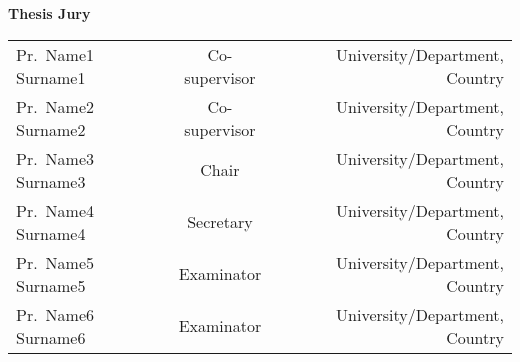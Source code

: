 \vspace{2cm}
\begin{flushleft}
    \begin{minipage}{0.6\linewidth}
        {\sffamily\bfseries Thesis Jury}\\
        \begin{tabular}{lcr}
            Pr.~Name1 {\sffamily Surname1} & Co-supervisor & University/Department, Country\\
            Pr.~Name2 {\sffamily Surname2} & Co-supervisor  & University/Department, Country\\
            Pr.~Name3 {\sffamily Surname3} & Chair & University/Department, Country\\
            Pr.~Name4 {\sffamily Surname4} & Secretary & University/Department, Country\\
            Pr.~Name5 {\sffamily Surname5} & Examinator & University/Department, Country\\
            Pr.~Name6 {\sffamily Surname6} & Examinator & University/Department, Country\\
            \end{tabular}
    \end{minipage}
\end{flushleft}


\endgroup
